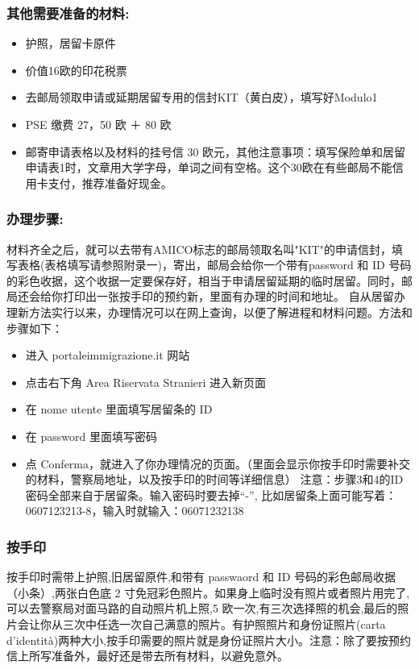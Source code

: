 \documentclass[3pt,a5paper,openright,twoside]{book}
\begin{document}
\subsubsection{其他需要准备的材料:}
\begin{itemize} 
\item 护照，居留卡原件
\item 价值16欧的印花税票
\item 去邮局领取申请或延期居留专用的信封KIT（黄白皮），填写好Modulo1
\item PSE 缴费 27，50 欧 ＋ 80 欧
\item 邮寄申请表格以及材料的挂号信 30 欧元，其他注意事项：填写保险单和居留申请表1时，文章用大学字母，单词之间有空格。这个30欧在有些邮局不能信用卡支付，推荐准备好现金。
\end{itemize}


\subsubsection{办理步骤:}
材料齐全之后，就可以去带有AMICO标志的邮局领取名叫"KIT"的申请信封，填写表格(表格填写请参照附录一)，寄出，邮局会给你一个带有password 和 ID 号码的彩色收据，这个收据一定要保存好，相当于申请居留延期的临时居留。同时，邮局还会给你打印出一张按手印的预约新，里面有办理的时间和地址。
自从居留办理新方法实行以来，办理情况可以在网上查询，以便了解进程和材料问题。方法和步骤如下：
\begin{itemize} 
\item 进入 portaleimmigrazione.it 网站
\item 点击右下角 Area Riservata Stranieri 进入新页面
\item 在 nome utente 里面填写居留条的 ID
\item 在 password 里面填写密码
\item 点 Conferma，就进入了你办理情况的页面。（里面会显示你按手印时需要补交的材料，警察局地址，以及按手印的时间等详细信息）
注意：步骤3和4的ID密码全部来自于居留条。输入密码时要去掉“-”, 比如居留条上面可能写着： 0607123213-8，输入时就输入：06071232138
\end{itemize}

\subsubsection{按手印}
按手印时需带上护照,旧居留原件,和带有 passwaord 和 ID 号码的彩色邮局收据（小条）,两张白色底 2 寸免冠彩色照片。如果身上临时没有照片或者照片用完了,可以去警察局对面马路的自动照片机上照,5 欧一次,有三次选择照的机会,最后的照片会让你从三次中任选一次自己满意的照片。有护照照片和身份证照片(carta d'identit\`a)两种大小,按手印需要的照片就是身份证照片大小。注意：除了要按预约信上所写准备外，最好还是带去所有材料，以避免意外。
\end{document}
